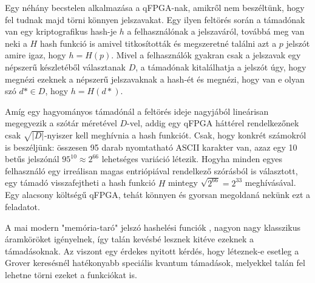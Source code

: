 \indent Egy néhány becstelen alkalmazása a qFPGA-nak, amikről nem beszéltünk, hogy fel tudnak majd törni könnyen jelszavakat.
Egy ilyen feltörés során a támadónak van egy kriptografikus hash-je $h$ a felhasználónak a jelszaváról, továbbá meg van neki a $H$ hash funkció is amivel titkosították és megszeretné találni azt a $p$ jelszót amire igaz, hogy $h=H(p)$.
Mivel a felhasználók gyakran csak a jelszavak egy népszerű készletéből választanak $D$, a támadónak kitalálhatja a jelszót úgy, hogy megnézi ezeknek a népszerű jelszavaknak a hash-ét és megnézi, hogy van e olyan szó $d* \in D$, hogy $h=H(d*)$.

\indent Amíg egy hagyományos támadónál a feltörés ideje nagyjából lineárisan megegyezik a szótár méretével $D$-vel, addig egy qFPGA háttérel rendelkezőnek csak $\sqrt{|D|}$-nyiszer kell meghívnia a hash funkciót.
Csak, hogy konkrét számokról is beszéljünk: összesen 95 darab nyomtatható ASCII karakter van, azaz egy 10 betűs jelszónál $95^{10}\approx 2^{66}$ lehetséges variáció létezik. Hogyha minden egyes felhasználó egy irreálisan magas entriópiával rendelkező szórásból is választott, egy támadó visszafejtheti a hash funkció $H$ mintegy $\sqrt{2^{66}}=2^{33}$ meghívásával.
Egy alacsony költségű qFPGA, tehát könnyen és gyorsan megoldaná nekünk ezt a feladatot.

\indent A mai modern "memória-taró" jelszó hashelési funciók , nagyon nagy klasszikus áramköröket igényelnek, így talán kevésbé lesznek kitéve ezeknek a támadásoknak.
Az viszont egy érdekes nyitott kérdés, hogy léteznek-e esetleg a Grover keresésnél hatékonyabb speciális kvantum támadások, melyekkel talán fel lehetne törni ezeket a funkciókat is.